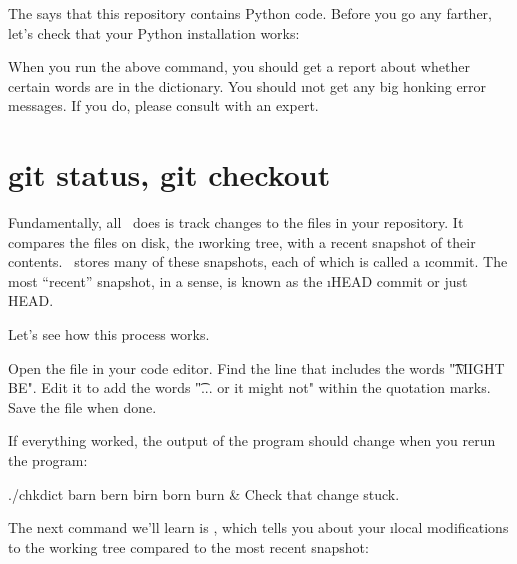 \documentclass[letterpaper, 12pt, titlepage, twoside]{article}
\begin{document}

The  says that this repository contains Python code. Before you go
any farther, let's check that your Python installation works:


When you run the above command, you should get a report about whether certain
words are in the dictionary. You should \i{not} get any big honking error
messages. If you do, please consult with an expert.

\vspace{3em}

\section{git status, git checkout}


Fundamentally, all \git\ does is track changes to the files in your
repository. It compares the files on disk, the \i{working tree}, with a recent
snapshot of their contents. \git\ stores many of these snapshots, each of
which is called a \i{commit}. The most ``recent'' snapshot, in a \x sense, is
known as the \i{HEAD} commit or just HEAD.

\vspace{2em}


Let's see how this process works.

\x
\begin{noncli}
  Open the file  in your code editor. Find the line that includes
  the words \t{"MIGHT BE"}. Edit it to add the words \t{"... or it might not"}
  within the quotation marks. Save the file when done.
\end{noncli}

If everything worked, the output of the program should change when you rerun
the program:

\begin{typeme}
./chkdict barn bern birn born burn & Check that change stuck.
\end{typeme}

The next command we'll learn is , which tells you about your
\i{local modifications} to the working tree compared to the most recent snapshot:
\end{document}
